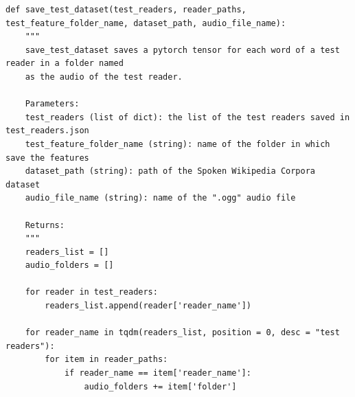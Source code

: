 \documentclass[12pt,a4paper,titlepage]{article}
\begin{document}
\begin{lstlisting}[language=iPython,firstnumber=10, caption=Funzione \texttt{save\_test\_dataset}, label=save_test_dataset,captionpos=b]
def save_test_dataset(test_readers, reader_paths, test_feature_folder_name, dataset_path, audio_file_name):
    """
    save_test_dataset saves a pytorch tensor for each word of a test reader in a folder named 
    as the audio of the test reader.

    Parameters:
    test_readers (list of dict): the list of the test readers saved in test_readers.json
    test_feature_folder_name (string): name of the folder in which save the features
    dataset_path (string): path of the Spoken Wikipedia Corpora dataset
    audio_file_name (string): name of the ".ogg" audio file 

    Returns:
    """
    readers_list = []
    audio_folders = []

    for reader in test_readers:
        readers_list.append(reader['reader_name'])

    for reader_name in tqdm(readers_list, position = 0, desc = "test readers"):
        for item in reader_paths:
            if reader_name == item['reader_name']:
                audio_folders += item['folder']


\end{lstlisting}
\end{document}

